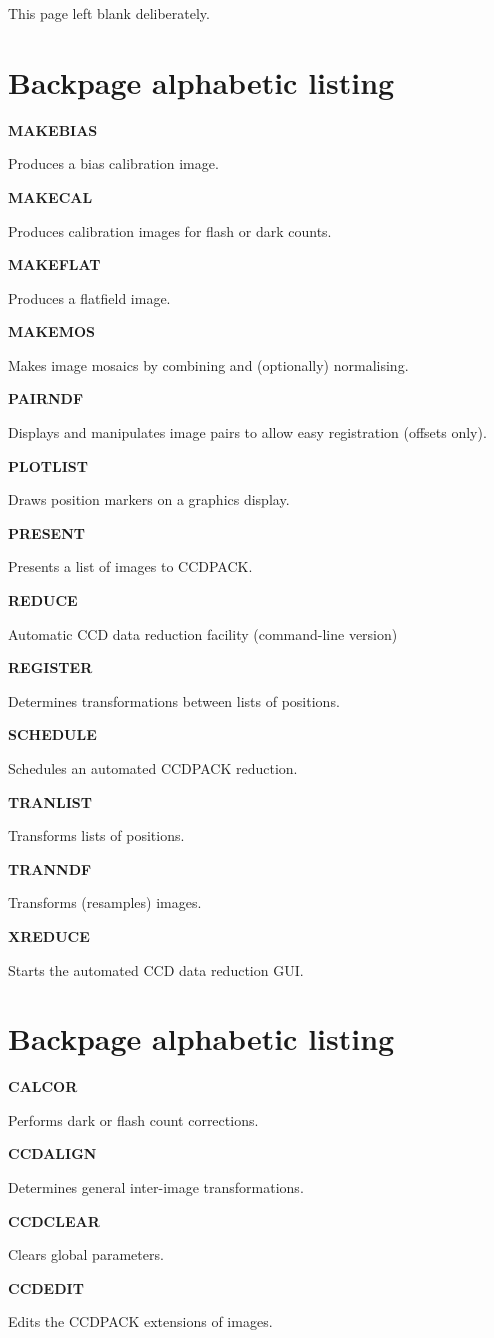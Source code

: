 \documentclass[twoside,11pt]{article}
\newenvironment{latexonly}{}{}
\renewcommand{\_}{\texttt{\symbol{95}}}
\newcommand{\quickdes}[3]{
                         \parbox{1.1in}{\bf #1}
                         \parbox{4.4in}{\raggedright #2 \dotfill}
                         \parbox{0.6in}{\pageref{#3}}
                         \vspace*{0.2in}}
\newcommand{\latexonlysection}[1]{\section{#1}}
\newcommand{\latexonlysection}[1]{#1}
\begin{document}
\begin{latexonly}

\newpage
This page left blank deliberately.
\newpage


\latexonlysection{Backpage alphabetic listing}

%
%

\quickdes{MAKEBIAS}{Produces a bias calibration image.}{MAKEBIAS}

\quickdes{MAKECAL}{Produces calibration images for flash or dark counts.}
                  {MAKECAL}

\quickdes{MAKEFLAT}{Produces a flatfield image.}
                   {MAKEFLAT}

\quickdes{MAKEMOS}{Makes image mosaics by combining and (optionally) normalising.}
                  {MAKEMOS}

\quickdes{PAIRNDF}{Displays and manipulates image pairs to allow easy
                   registration (offsets only).}
                  {PAIRNDF}

\quickdes{PLOTLIST}{Draws position markers on a graphics display.}
                   {PLOTLIST}

\quickdes{PRESENT}{Presents a list of images to CCDPACK.}{PRESENT}

\quickdes{REDUCE}{Automatic CCD data reduction facility (command-line version)}
                 {REDUCE}

\quickdes{REGISTER}{Determines transformations between lists of positions.}
                   {REGISTER}

\quickdes{SCHEDULE}{Schedules an automated CCDPACK reduction.}{SCHEDULE}

\quickdes{TRANLIST}{Transforms lists of positions.}
                   {TRANLIST}

\quickdes{TRANNDF}{Transforms (resamples) images.}
                  {TRANNDF}

\quickdes{XREDUCE}{Starts the automated CCD data reduction GUI.}{XREDUCE}

\newpage
\latexonlysection{Backpage alphabetic listing}

\quickdes{CALCOR}{Performs dark or flash count corrections.}{CALCOR}

\quickdes{CCDALIGN}{Determines general inter-image transformations.}
         {CCDALIGN}

\quickdes{CCDCLEAR}{Clears global parameters.}
         {CCDCLEAR}

\quickdes{CCDEDIT}{Edits the CCDPACK extensions of images.}
         {CCDEDIT}


\end{latexonly}
\end{document}
